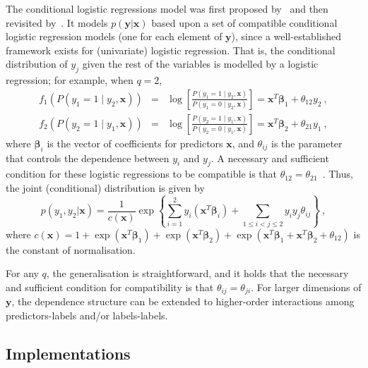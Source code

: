 \documentclass[review]{elsarticle}
\begin{document}
	The conditional logistic regressions model was first proposed by~\citet{JOE} and then revisited by~\citet{MVB}. It models $p(\mathbf{y}|\mathbf{x})$ based upon a set of compatible conditional logistic regression models (one for each element of $\mathbf{y}$), since a well-established framework exists for (univariate) logistic regression. That is, the conditional distribution of $y_{j}$ given the rest of the variables is modelled by a logistic regression; for example, when $q=2$,
	\begin{eqnarray*}
		f_1 \left( P(y_{1} = 1 \mid y_{2},\mathbf{x}) \right) &=& \log \left[ \frac{P(y_{1} = 1\mid y_{2},\mathbf{x})}{P(y_{1} = 0\mid y_{2},\mathbf{x})} \right] = \mathbf{x}^T\bm{\beta} _{1} + \theta_{12}y_{2}\ , \\
		f_2 \left( P(y_{2} = 1 \mid y_{1},\mathbf{x}) \right) &=& \log \left[ \frac{P(y_{2} = 1\mid y_{1},\mathbf{x})}{P(y_{2} = 0\mid y_{1},\mathbf{x})} \right] = \mathbf{x}^T\bm{\beta} _{2} + \theta_{21}y_{1}\ ,
	\end{eqnarray*}
	where $\bm{\beta}_{i}$ is the vector of coefficients for predictors $\mathbf{x}$, and $\theta_{ij}$ is the parameter that controls the dependence between $y_{i}$ and $y_{j}$. A necessary and sufficient condition for these logistic regressions to be compatible is that $\theta_{12} = \theta_{21}$~\citep{JOE}. Thus, the joint (conditional) distribution is given by
	\begin{equation} \label{JC}
	p(y_{1},y_{2}|\mathbf{x}) = \frac{1}{c(\mathbf{x})} \exp \left \{ \sum^{2}_{i=1}{y_{i} \left( \mathbf{x}^T \bm{\beta}_{i} \right)} + \sum_{1 \leq i < j \leq 2}{y_{i}y_{j}\theta_{ij}} \right\}\ ,
	\end{equation}
	where $c(\mathbf{x}) = 1 + \exp(\mathbf{x}^T\bm{\beta}_{1}) + \exp(\mathbf{x}^T\bm{\beta}_{2}) + \exp(\mathbf{x}^T\bm{\beta}_{1}+\mathbf{x}^T\bm{\beta}_{2} + \theta_{12})$ is the constant of normalisation.
	
	For any $q$, the generalisation is straightforward, and it holds that the necessary and sufficient condition for compatibility is that $\theta_{ij} = \theta_{ji}$. For larger dimensions of $\mathbf{y}$, the dependence structure can be extended to higher-order interactions among predictors-labels and/or labels-labels.
	
	\subsection{Implementations}
	
\end{document}
